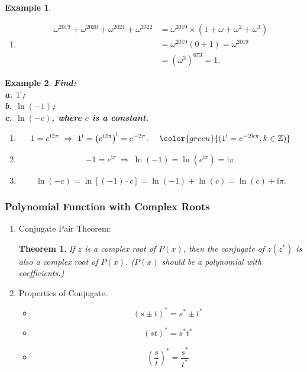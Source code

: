 \documentclass[12pt, a4paper]{article}
\newtheorem{theorem}{Theorem}[subsection]
\newtheorem{example}{Example}[subsection]
\def\Z{{\mathbb{Z}}}
\def\i{{\mathrm{i}}}
\begin{document}
\begin{enumerate}
\begin{example}
\begin{enumerate}
      $\omega^2+\omega+1=0$ is a geometric sequence, $u_1=1,\ r=\omega:$
      $$S_3=\frac{u_1(1-r^3)}{1-r}=\frac{1-\omega^3}{1-\omega}=\frac{0}{1-\omega}=0.$$
      \item $$\begin{aligned}
        \omega^{2019}+\omega^{2020}+\omega^{2021}+\omega^{2022}&=\omega^{2019}\times(1+\omega+\omega^2+\omega^3)\\
        &=\omega^{2019}(0+1)=\omega^{2019}\\
        &=\left(\omega^{3}\right)^{673}=1.
      \end{aligned}$$
    \end{enumerate}
  \end{example}
  \begin{example}
    \textbf{Find: \\
    a. $1^\i$;\\
    b. $\ln(-1)$;\\
    c. $\ln(-c)$, where $c$ is a constant. }
    \begin{enumerate}
      \item $$1=e^{\i 2\pi}\ \Rightarrow\ 1^\i=\left(e^{\i 2\pi}\right)^\i=e^{-2\pi}. \ \ \ \ {\color{green}{(1^\i=e^{-2k\pi}, k\in\Z)}}$$
      \item $$-1=e^{\i\pi}\ \Rightarrow\ \ln(-1)=\ln\left(e^{\i\pi}\right)=\i\pi.$$
      \item $$\ln(-c)=\ln\left[(-1)\cdot c\right]=\ln(-1)+\ln(c)=\ln(c)+\i\pi.$$
    \end{enumerate}
  \end{example}
\end{enumerate}

\subsubsection{Polynomial Function with Complex Roots}
\begin{enumerate}
  \item Conjugate Pair Theorem: 
  \begin{theorem}
    If $z$ is a complex root of $P(x)$, then the conjugate of $z(z^*)$ is also a complex root of $P(x)$. ($P(x)$ should be a polynomial with {\color{red}{rational}} coefficients.)
  \end{theorem}
  \item Properties of Conjugate. 
  \begin{itemize}
    \item $$(s\pm t)^*=s^*\pm t^*$$
    \item $$(st)^*=s^*t^*$$
    \item $$\left(\frac{s}{t}\right)^*=\frac{s^*}{t^*}$$
  \end{itemize}
\end{enumerate}
\end{document}
